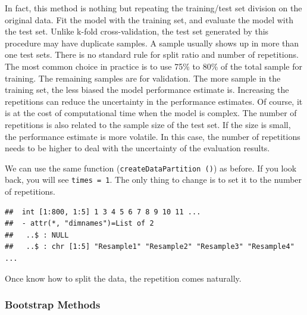 \documentclass[
  12pt,
]{krantz}
\makeatletter
\newenvironment{Shaded}{\begin{snugshade}}{\end{snugshade}}
\newcommand{\AttributeTok}[1]{\textcolor[rgb]{0.61,0.61,0.61}{#1}}
\newcommand{\ConstantTok}[1]{\textcolor[rgb]{0,0,0}{#1}}
\newcommand{\DecValTok}[1]{\textcolor[rgb]{0.06,0.06,0.06}{#1}}
\newcommand{\FunctionTok}[1]{\textcolor[rgb]{0,0,0}{#1}}
\newcommand{\NormalTok}[1]{#1}
\newcommand{\OtherTok}[1]{\textcolor[rgb]{0.37,0.37,0.37}{#1}}
\newcommand{\SpecialCharTok}[1]{\textcolor[rgb]{0,0,0}{#1}}
\newenvironment{kframe}{%
\medskip{}
\setlength{\fboxsep}{.8em}
 \def\at@end@of@kframe{}%
 \ifinner\ifhmode%
  \def\at@end@of@kframe{\end{minipage}}%
  \begin{minipage}{\columnwidth}%
 \fi\fi%
 \def\FrameCommand##1{\hskip\@totalleftmargin \hskip-\fboxsep
 \colorbox{shadecolor}{##1}\hskip-\fboxsep
     \hskip-\linewidth \hskip-\@totalleftmargin \hskip\columnwidth}%
 \MakeFramed {\advance\hsize-\width
   \@totalleftmargin\z@ \linewidth\hsize
   \@setminipage}}%
 {\par\unskip\endMakeFramed%
 \at@end@of@kframe}
\renewenvironment{Shaded}{\begin{kframe}}{\end{kframe}}
\makeatother
\begin{document}
In fact, this method is nothing but repeating the training/test set division on the original data. Fit the model with the training set, and evaluate the model with the test set. Unlike k-fold cross-validation, the test set generated by this procedure may have duplicate samples. A sample usually shows up in more than one test sets. There is no standard rule for split ratio and number of repetitions. The most common choice in practice is to use 75\% to 80\% of the total sample for training. The remaining samples are for validation. The more sample in the training set, the less biased the model performance estimate is. Increasing the repetitions can reduce the uncertainty in the performance estimates. Of course, it is at the cost of computational time when the model is complex. The number of repetitions is also related to the sample size of the test set. If the size is small, the performance estimate is more volatile. In this case, the number of repetitions needs to be higher to deal with the uncertainty of the evaluation results.

We can use the same function (\texttt{createDataPartition\ ()}) as before. If you look back, you will see \texttt{times\ =\ 1}. The only thing to change is to set it to the number of repetitions.

\begin{Shaded}
\end{Shaded}

\begin{verbatim}
##  int [1:800, 1:5] 1 3 4 5 6 7 8 9 10 11 ...
##  - attr(*, "dimnames")=List of 2
##   ..$ : NULL
##   ..$ : chr [1:5] "Resample1" "Resample2" "Resample3" "Resample4" ...
\end{verbatim}

Once know how to split the data, the repetition comes naturally.

\hypertarget{bootstrap-methods}{%
\subsubsection{Bootstrap Methods}\label{bootstrap-methods}}
\end{document}

